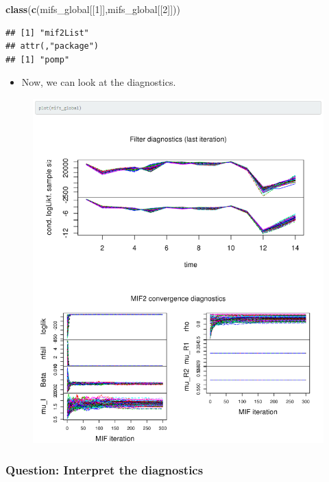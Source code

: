 \documentclass[]{article}
\newenvironment{Shaded}{\begin{snugshade}}{\end{snugshade}}
\newcommand{\KeywordTok}[1]{\textcolor[rgb]{0.13,0.29,0.53}{\textbf{#1}}}
\newcommand{\DecValTok}[1]{\textcolor[rgb]{0.00,0.00,0.81}{#1}}
\newcommand{\NormalTok}[1]{#1}
\providecommand{\tightlist}{%
  \setlength{\itemsep}{0pt}\setlength{\parskip}{0pt}}
\begin{document}
\begin{Shaded}
\begin{Highlighting}[]
\KeywordTok{class}\NormalTok{(}\KeywordTok{c}\NormalTok{(mifs_global[[}\DecValTok{1}\NormalTok{]],mifs_global[[}\DecValTok{2}\NormalTok{]]))}
\end{Highlighting}
\end{Shaded}

\begin{verbatim}
## [1] "mif2List"
## attr(,"package")
## [1] "pomp"
\end{verbatim}

\begin{itemize}
\tightlist
\item
  Now, we can look at the diagnostics.
\end{itemize}


\begin{figure}[h!]
	\centering
	\includegraphics[width=0.9\linewidth]{figure/notes12-added_plot}
\end{figure}


\subsubsection{Question: Interpret the
diagnostics}\label{question-interpret-the-diagnostics}
\end{document}

